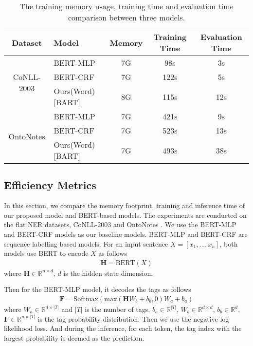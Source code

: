 \documentclass[11pt,a4paper]{article}
\begin{document}
\begin{table*}[!h]
  \centering
  \begin{tabular}{clccc}
  \toprule
  Dataset                     & Model      & Memory & Training Time& Evaluation Time\\
  \midrule
  \multirow{3}{*}{CoNLL-2003} & BERT-MLP   & 7G              & 98s           & 3s              \\
                              & BERT-CRF   & 7G              & 122s          & 5s              \\
                              & Ours(Word)[BART] & 8G              & 115s          & 12s             \\
  \midrule
  \multirow{3}{*}{OntoNotes}  & BERT-MLP   & 7G              & 421s          & 9s              \\
                              & BERT-CRF   & 7G              & 523s          & 13s             \\
                              & Ours(Word)[BART] & 7G              & 493s          & 38s         \\
  \bottomrule    
  \end{tabular}
  \caption{The training memory usage, training time and evaluation time comparison between three models. }
  \label{tb:efficiency}
\end{table*}


\subsection{Efficiency Metrics}
In this section, we compare the memory footprint, training and inference time of our proposed model and BERT-based models. The experiments are conducted on the flat NER datasets, CoNLL-2003 \cite{DBLP:conf/conll/SangM03} and OntoNotes \cite{DBLP:conf/conll/PradhanMXUZ12}. We use the BERT-MLP and BERT-CRF models as our baseline models. BERT-MLP and BERT-CRF are sequence labelling based models. For an input sentence $X=[x_1, ..., x_n]$, both models use BERT \cite{DBLP:conf/naacl/DevlinCLT19} to encode $X$ as follows
\begin{align}
  \mathbf{H} = \mathrm{BERT}(X)
\end{align}
where $\mathbf{H} \in \mathbb{R}^{n \times d}$, $d$ is the hidden state dimension.

Then for the BERT-MLP model, it decodes the tags as follows
\begin{align}
  \mathbf{F} = \mathrm{Softmax}( \mathrm{max}(\mathbf{H}W_b+b_b, 0)W_a + b_a)
\end{align}
where $W_a \in \mathbb{R}^{d \times |T|}$ and $|T|$ is the number of tags, $b_a \in \mathbb{R}^{|T|}$, $W_b \in \mathbb{R}^{d \times d}$, $b_b \in \mathbb{R}^{d}$, $\mathbf{F} \in \mathbb{R}^{n \times |T|}$ is the tag probability distribution. Then we use the negative log likelihood loss. And during the inference, for each token, the tag index with the largest probability is deemed as the prediction. 
\end{document}
